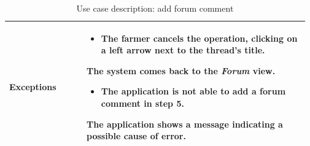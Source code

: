 \begin{table}[H]
\begin{tabular}{@{}p{0.25\linewidth} p{0.72\linewidth}@{}}
		\textbf{Exceptions}         & \begin{itemize}[leftmargin=.4cm,noitemsep,topsep=0pt,before=\vspace{-3mm}]
		   \item The farmer cancels the operation, clicking on a left arrow next to the thread's title.
		\end{itemize}
	    The system comes back to the \textit{Forum} view.
	    \begin{itemize}[leftmargin=.4cm,noitemsep,topsep=0pt]
		   \item The application is not able to add a forum comment in step 5. 
		\end{itemize}
		The application shows a message indicating a possible cause of error.
		\\\bottomrule
	\end{tabular}
	\caption{Use case description: add forum comment} 
\end{table}


